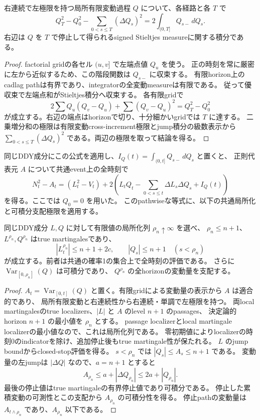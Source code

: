 \begin{lemma}[有限変動成分の二乗残差]
右連続で左極限を持つ局所有限変動過程 $Q$ について、各経路と各 $T$ で
\[
 Q_T^2-Q_0^2-\sum_{0<s\le T}(\Delta Q_s)^2
   =2\int_{(0,T]}Q_{s-}\,dQ_s.
\]
右辺は $Q$ を $T$ で停止して得られるsigned Stieltjes measureに関する積分である。
\end{lemma}

\begin{proof}
factorial gridの各セル $(u,v]$ で左端点値 $Q_u$ を使う。
正の時刻を常に厳密に左から近似するため、この階段関数は $Q_{s-}$ に収束する。
有限horizon上のcadlag pathは有界であり、integratorの全変動measureは有限である。
従って優収束で左端点和がStieltjes積分へ収束する。
各有限gridで
\[
 2\sum Q_u(Q_v-Q_u)+\sum(Q_v-Q_u)^2=Q_T^2-Q_0^2
\]
が成立する。右辺の端点はhorizonで切り、十分細かいgridでは $T$ に達する。
二乗増分和の極限は有限変動cross-increment極限とjump積分の級数表示から
$\sum_{0<s\le T}(\Delta Q_s)^2$ である。両辺の極限を取って結論を得る。
\end{proof}

同じDDY成分にこの公式を適用し、$I_Q(t)=\int_{(0,t]}Q_{s-}\,dQ_s$ と置くと、
正則代表元 $A$ について共通event上の全時刻で
\[
 N_t^2-A_t=(L_t^2-V_t)+
   2\left(L_tQ_t-\sum_{0<s\le t}\Delta L_s\Delta Q_s+I_Q(t)\right)
\]
を得る。ここでは $Q_0=0$ を用いた。
このpathwiseな等式に、以下の共通局所化と可積分支配極限を適用する。

\begin{lemma}[全変動が可積分となる共通局所化]
同じDDY成分 $L,Q$ に対して有限値の局所化列 $\rho_n\uparrow\infty$ を選べ、
$\rho_n\le n+1$、$L^{\rho_n},Q^{\rho_n}$ はtrue martingalesであり、
\[
 |L^{\rho_n}_t|\le n+1+2c,\qquad
 |Q_s|\le n+1\quad(s<\rho_n)
\]
が成立する。前者は共通の確率1の集合上で全時刻の評価である。
さらに $\operatorname{Var}_{[0,\rho_n]}(Q)$ は可積分であり、
$Q^{\rho_n}$ の全horizonの変動量を支配する。
\end{lemma}

\begin{proof}
$A_t=\operatorname{Var}_{[0,t]}(Q)$ と置く。有限gridによる変動量の表示から $A$ は適合的であり、
局所有限変動と右連続性から右連続・単調で左極限を持つ。
両local martingalesのtrue localizers、$|L|$ と $A$ のlevel $n+1$ のpassages、
決定論的horizon $n+1$ の最小値を $\rho_n$ とする。
passage localizerとlocal martingale localizerの最小値なので、これは局所化列である。
零初期値によりlocalizerの時刻0のindicatorを除け、追加停止後もtrue martingale性が保たれる。
$L$ のjump boundからclosed-stop評価を得る。
$s<\rho_n$ では $|Q_s|\le A_s\le n+1$ である。
変動量の左jumpは $|\Delta Q|$ なので、$a=n+1$ とすると
\[
 A_{\rho_n}\le a+|\Delta Q_{\rho_n}|
 \le 2a+|Q_{\rho_n}|.
\]
最後の停止値はtrue martingaleの有界停止値であり可積分である。
停止した累積変動の可測性とこの支配から $A_{\rho_n}$ の可積分性を得る。
停止pathの変動量は $A_{t\wedge\rho_n}$ であり、$A_{\rho_n}$ 以下である。
\end{proof}

